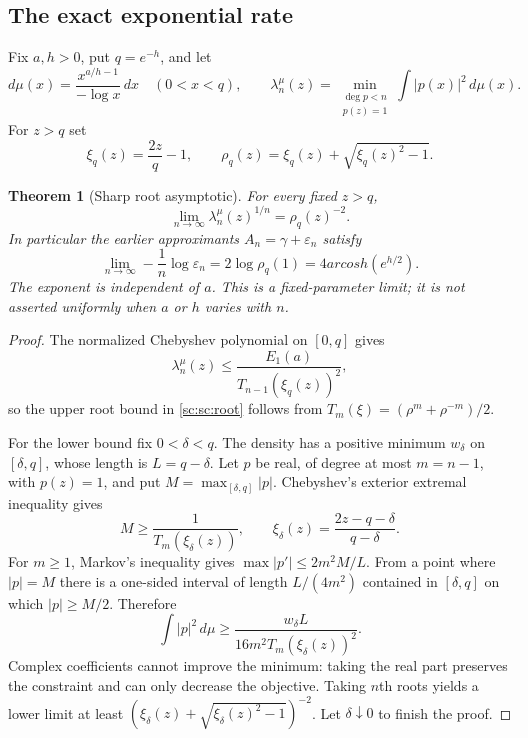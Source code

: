 \documentclass[11pt,a4paper]{article}
\newtheorem{theorem}{Theorem}[section]
\theoremstyle{definition}
\theoremstyle{remark}
\theoremstyle{plain}
\numberwithin{equation}{section}
\def\operatorname#1{#1}\def\mathrm#1{#1}}
\begin{document}
\subsection{The exact exponential rate}

Fix $a,h>0$, put $q=e^{-h}$, and let
\[
 d\mu(x)=\frac{x^{a/h-1}}{-\log x}\,dx\quad(0<x<q),\qquad
 \lambda_n^\mu(z)=\min_{\substack{\deg p<n\\p(z)=1}}
                         \int |p(x)|^2\,d\mu(x).
\]
For $z>q$ set
\[
 \xi_q(z)=\frac{2z}{q}-1,\qquad
 \rho_q(z)=\xi_q(z)+\sqrt{\xi_q(z)^2-1}.
\]

\begin{theorem}[Sharp root asymptotic]\label{sc:sc:root-rate}
For every fixed $z>q$,
\begin{equation}\label{sc:sc:root}
 \lim_{n\to\infty}\lambda_n^\mu(z)^{1/n}=\rho_q(z)^{-2}.
\end{equation}
In particular the earlier approximants $A_n=\gamma+\varepsilon_n$
satisfy
\[
 \lim_{n\to\infty}-\frac1n\log\varepsilon_n
 =2\log\rho_q(1)=4\operatorname{arcosh}(e^{h/2}).
\]
The exponent is independent of $a$.  This is a fixed-parameter limit;
it is not asserted uniformly when $a$ or $h$ varies with $n$.
\end{theorem}
\begin{proof}
The normalized Chebyshev polynomial on $[0,q]$ gives
\[
 \lambda_n^\mu(z)\le
 \frac{E_1(a)}{T_{n-1}(\xi_q(z))^2},
\]
so the upper root bound in \eqref{sc:sc:root} follows from
$T_m(\xi)=(\rho^m+\rho^{-m})/2$.

For the lower bound fix $0<\delta<q$.  The density has a positive
minimum $w_\delta$ on $[\delta,q]$, whose length is $L=q-\delta$.
Let $p$ be real, of degree at most $m=n-1$, with $p(z)=1$, and put
$M=\max_{[\delta,q]}|p|$.  Chebyshev's exterior extremal inequality gives
\[
 M\ge\frac1{T_m(\xi_\delta(z))},\qquad
 \xi_\delta(z)=\frac{2z-q-\delta}{q-\delta}.
\]
For $m\ge1$, Markov's inequality gives
$\max|p'|\le2m^2M/L$.  From a point where $|p|=M$ there is a one-sided
interval of length $L/(4m^2)$ contained in $[\delta,q]$ on which
$|p|\ge M/2$.  Therefore
\[
 \int |p|^2\,d\mu\ge
 \frac{w_\delta L}{16m^2T_m(\xi_\delta(z))^2}.
\]
Complex coefficients cannot improve the minimum: taking the real part
preserves the constraint and can only decrease the objective.  Taking
$n$th roots yields a lower limit at least
$(\xi_\delta(z)+\sqrt{\xi_\delta(z)^2-1})^{-2}$.
Let $\delta\downarrow0$ to finish the proof.
\end{proof}
\end{document}
